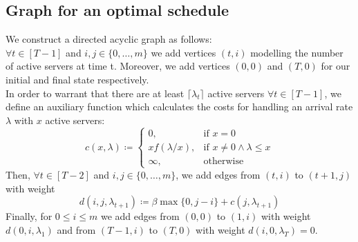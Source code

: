 \documentclass[hidelinks]{article}
\theoremstyle{plain}
\theoremstyle{definition}
\theoremstyle{rem}
\newcommand{\fromto}[2]{\{#1,\ldots,#2\}}
\begin{document}
\subsection{Graph for an optimal schedule}\label{sec:optgraph}
We construct a directed acyclic graph as follows:\\
$\forall t\in[T-1]$ and $i,j\in\fromto{0}{m}$ we add vertices $(t,i)$ modelling the number of active servers at time t. Moreover, we add vertices $(0,0)$ and $(T,0)$ for our initial and final state respectively.\\
In order to warrant that there are at least $\lceil\lambda_t\rceil$ active servers $\forall t\in[T-1]$, we define an auxiliary function which calculates the costs for handling an arrival rate $\lambda$ with $x$ active servers:
\begin{equation}
	c(x,\lambda)\coloneqq\begin{cases}
          0, & \text{if $x=0$}\\
	  xf(\lambda/x), & \text{if $x\ne 0\wedge\lambda\le x$}\\
	  \infty, & \text{otherwise}
	  \end{cases} \label{fct:c}
\end{equation}
Then, $\forall t\in[T-2]$ and $i,j\in\fromto{0}{m}$, we add edges from $(t,i)$ to $(t+1,j)$ with weight
\begin{equation}
	d(i,j,\lambda_{t+1})\coloneqq\beta\max\{0,j-i\}+c(j,\lambda_{t+1})
\end{equation}
Finally, for $0\le i\le m$ we add edges from $(0,0)$ to $(1,i)$ with weight $d(0,i,\lambda_1)$ and from $(T-1,i)$ to $(T,0)$ with weight $d(i,0,\lambda_T)=0$.
\end{document}
